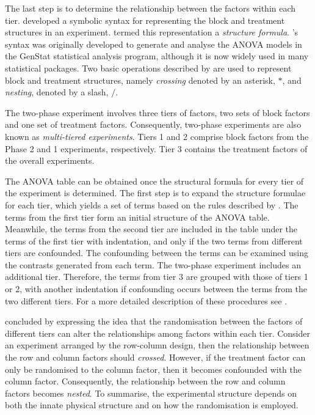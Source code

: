 \documentclass[11pt,a4paper]{article}
\begin{document}
The last step is to determine the relationship between the factors within each tier. \cite{Wilkinson1973} developed a symbolic syntax for representing the block and treatment structures in an experiment. \cite{Brien1999} termed this representation a \emph{structure formula}. \citeauthor{Wilkinson1973}'s syntax was originally developed to generate and analyse the ANOVA models in the GenStat statistical analysis program, although it is now widely used in many statistical packages. Two basic operations described by \cite{Wilkinson1973} are used to represent block and treatment structures, namely \emph{crossing} denoted by an asterisk, $*$, and \emph{nesting}, denoted by a slash, $/$. 

The two-phase experiment involves three tiers of factors, two sets of block factors and one set of treatment factors. Consequently, two-phase experiments are also known as \emph{multi-tiered experiments}. Tiers 1 and 2 comprise block factors from the Phase 2 and 1 experiments, respectively. Tier 3 contains the treatment factors of the overall experiments.  

The ANOVA table can be obtained once the structural formula for every tier of the experiment is determined. The first step is to expand the structure formulae for each tier, which yields a set of terms based on the rules described by \cite{Wilkinson1973}. The terms from the first tier form an initial structure of the ANOVA table. Meanwhile, the terms from the second tier are included in the table under the terms of the first tier with indentation, and only if the two terms from different tiers are confounded. The confounding between the terms can be examined using the contrasts generated from each term. The two-phase experiment includes an additional tier. Therefore, the terms from tier 3 are grouped with those of tiers 1 or 2, with another indentation if confounding occurs between the terms from the two different tiers. For a more detailed description of these procedures see \cite{Brien1983}.

\cite{Brien1983} concluded by expressing the idea that the randomisation between the factors of different tiers can alter the relationships among factors within each tier. Consider an experiment arranged by the row-column design, then the relationship between the row and column factors should \emph{crossed}. However, if the treatment factor can only be randomised to the column factor, then it becomes confounded with the column factor. Consequently, the relationship between the row and column factors becomes \emph{nested}. To summarise, the experimental structure depends on both the innate physical structure and on how the randomisation is employed. 
\end{document}
